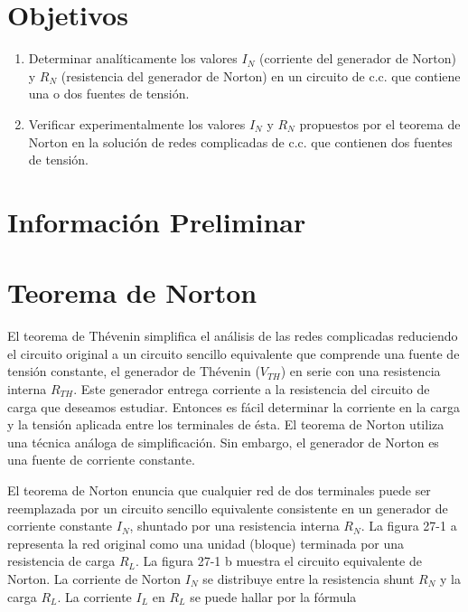 \section{Objetivos}
\begin{enumerate}
    \item Determinar analíticamente los valores \( I_N \) (corriente del generador de Norton) y \( R_N \) (resistencia del generador de Norton) en un circuito de c.c. que contiene una o dos fuentes de tensión.
    \item Verificar experimentalmente los valores \( I_N \) y \( R_N \) propuestos por el teorema de Norton en la solución de redes complicadas de c.c. que contienen dos fuentes de tensión.
\end{enumerate}

\section{Información Preliminar}
\section*{Teorema de Norton}
El teorema de Thévenin simplifica el análisis de las redes complicadas reduciendo el circuito original a un circuito sencillo equivalente que comprende una fuente de tensión constante, el generador de Thévenin (\( V_{TH} \)) en serie con una resistencia interna \( R_{TH} \). Este generador entrega corriente a la resistencia del circuito de carga que deseamos estudiar. Entonces es fácil determinar la corriente en la carga y la tensión aplicada entre los terminales de ésta. El teorema de Norton utiliza una técnica análoga de simplificación. Sin embargo, el generador de Norton es una fuente de corriente constante.

El teorema de Norton enuncia que cualquier red de dos terminales puede ser reemplazada por un circuito sencillo equivalente consistente en un generador de corriente constante \( I_N \), shuntado por una resistencia interna \( R_N \). La figura 27-1 a representa la red original como una unidad (bloque) terminada por una resistencia de carga \( R_L \). La figura 27-1 b muestra el circuito equivalente de Norton. La corriente de Norton \( I_N \) se distribuye entre la resistencia shunt \( R_N \) y la carga \( R_L \). La corriente \( I_L \) en \( R_L \) se puede hallar por la fórmula

